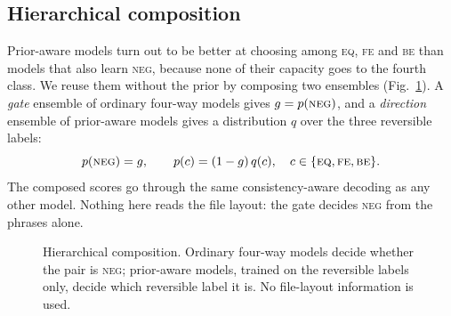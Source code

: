 \documentclass[conference]{IEEEtran}
\newcommand{\EQ}{\textsc{eq}}
\newcommand{\FE}{\textsc{fe}}
\newcommand{\BE}{\textsc{be}}
\newcommand{\NEG}{\textsc{neg}}
\begin{document}
\subsection{Hierarchical composition}
\label{sec:hier}
Prior-aware models turn out to be better at choosing among \EQ, \FE{} and \BE{}
than models that also learn \NEG, because none of their capacity goes to the
fourth class. We reuse them without the prior by composing two ensembles
(Fig.~\ref{fig:hier}). A \emph{gate} ensemble of ordinary four-way models gives
$g=p(\NEG)$, and a \emph{direction} ensemble of prior-aware models gives a
distribution $q$ over the three reversible labels:
\begin{equation}
  p(\NEG)=g,\qquad p(c)=(1-g)\,q(c),\quad c\in\{\EQ,\FE,\BE\}.
\end{equation}
The composed scores go through the same consistency-aware decoding as any
other model. Nothing here reads the file layout: the gate decides \NEG{} from
the phrases alone.

\begin{figure}[t]
\centering
{}
\caption{Hierarchical composition. Ordinary four-way models decide whether the
pair is \NEG; prior-aware models, trained on the reversible labels only, decide
which reversible label it is. No file-layout information is used.}
\label{fig:hier}
\end{figure}
\end{document}
